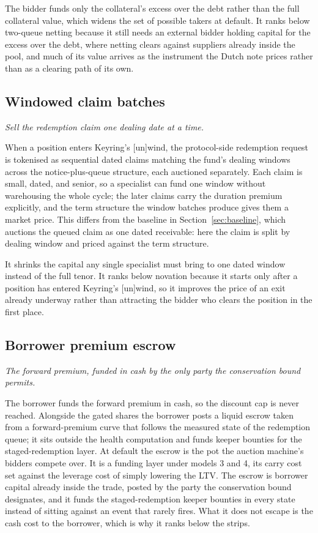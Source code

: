 \documentclass[11pt,a4paper]{article}
\newcommand{\model}[2]{\subsection{#1}\noindent\textit{#2}\medskip}
\begin{document}
The bidder funds only the collateral's excess over the debt rather than the full collateral value, which widens the set of possible takers at default. It ranks below two-queue netting because it still needs an external bidder holding capital for the excess over the debt, where netting clears against suppliers already inside the pool, and much of its value arrives as the instrument the Dutch note prices rather than as a clearing path of its own.

\model{Windowed claim batches}{Sell the redemption claim one dealing date at a time.}

When a position enters Keyring's [un]wind, the protocol-side redemption request is tokenised as sequential dated claims matching the fund's dealing windows across the notice-plus-queue structure, each auctioned separately. Each claim is small, dated, and senior, so a specialist can fund one window without warehousing the whole cycle; the later claims carry the duration premium explicitly, and the term structure the window batches produce gives them a market price. This differs from the baseline in Section~\ref{sec:baseline}, which auctions the queued claim as one dated receivable: here the claim is split by dealing window and priced against the term structure.

It shrinks the capital any single specialist must bring to one dated window instead of the full tenor. It ranks below novation because it starts only after a position has entered Keyring's [un]wind, so it improves the price of an exit already underway rather than attracting the bidder who clears the position in the first place.

\model{Borrower premium escrow}{The forward premium, funded in cash by the only party the conservation bound permits.}

The borrower funds the forward premium in cash, so the discount cap is never reached. Alongside the gated shares the borrower posts a liquid escrow taken from a forward-premium curve that follows the measured state of the redemption queue; it sits outside the health computation and funds keeper bounties for the staged-redemption layer. At default the escrow is the pot the auction machine's bidders compete over. It is a funding layer under models 3 and 4, its carry cost set against the leverage cost of simply lowering the LTV. The escrow is borrower capital already inside the trade, posted by the party the conservation bound designates, and it funds the staged-redemption keeper bounties in every state instead of sitting against an event that rarely fires. What it does not escape is the cash cost to the borrower, which is why it ranks below the strips.
\end{document}
